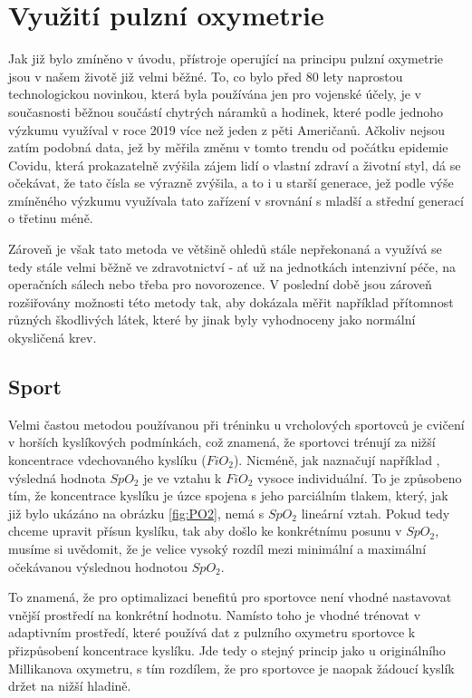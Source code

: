 \section {Využití pulzní oxymetrie}
Jak již bylo zmíněno v úvodu, přístroje operující na principu pulzní oxymetrie jsou v našem životě již velmi běžné. To, co bylo před 80 lety naprostou technologickou novinkou, která byla používána jen pro vojenské účely, je v současnosti běžnou součástí chytrých náramků a hodinek, které podle jednoho výzkumu \citep{wearables} využíval v roce 2019 více než jeden z pěti Američanů. Ačkoliv nejsou zatím podobná data, jež by měřila změnu v tomto trendu od počátku epidemie Covidu, která prokazatelně zvýšila zájem lidí o vlastní zdraví a životní styl, dá se očekávat, že tato čísla se výrazně zvýšila, a to i u starší generace, jež podle výše zmíněného výzkumu využívala tato zařízení v srovnání s mladší a střední generací o třetinu méně.
\par Zároveň je však tato metoda ve většině ohledů stále nepřekonaná a využívá se tedy stále velmi běžně ve zdravotnictví - ať už na jednotkách intenzivní péče, na operačních sálech nebo třeba pro novorozence. V poslední době jsou zároveň rozšiřovány možnosti této metody tak, aby dokázala měřit například přítomnost různých škodlivých látek, které by jinak byly vyhodnoceny jako normální okysličená krev.
\subsection {Sport}
Velmi častou metodou používanou při tréninku u vrcholových sportovců je cvičení v horších kyslíkových podmínkách, což znamená, že sportovci trénují za nižší koncentrace vdechovaného kyslíku ($FiO_2$). Nicméně, jak naznačují například \cite{fio2}, výsledná hodnota $SpO_2$ je ve vztahu k $FiO_2$ vysoce individuální. To je způsobeno tím, že koncentrace kyslíku je úzce spojena s jeho parciálním tlakem, který, jak již bylo ukázáno na obrázku \ref{fig:PO2}, nemá s $SpO_2$ lineární vztah. Pokud tedy chceme upravit přísun kyslíku, tak aby došlo ke konkrétnímu posunu v $SpO_2$, musíme si uvědomit, že je velice vysoký rozdíl mezi minimální a maximální očekávanou výslednou hodnotou $SpO_2$. 
\par To znamená, že pro optimalizaci benefitů pro sportovce není vhodné nastavovat vnější prostředí na konkrétní hodnotu. Namísto toho je vhodné trénovat v adaptivním prostředí, které používá dat z pulzního oxymetru sportovce k přizpůsobení koncentrace kyslíku. Jde tedy o stejný princip jako u originálního Millikanova oxymetru, s tím rozdílem, že pro sportovce je naopak žádoucí kyslík držet na nižší hladině. \citep{sportuse}
